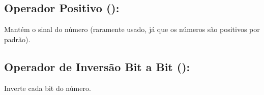 \documentclass[letterpaper,10pt,english]{jupyterBook}
\begin{document}
\begin{sphinxVerbatim}[commandchars=\\\{\}]
  
  
\end{sphinxVerbatim}

\begin{sphinxVerbatim}[commandchars=\\\{\}]
\end{sphinxVerbatim}


\subsection{Operador Positivo (\sphinxstyleliteralintitle{\sphinxupquote{+}}):}
\label{\detokenize{chapters/ch3/ch3:operador-positivo}}
\sphinxAtStartPar
Mantém o sinal do número (raramente usado, já que os números são positivos por padrão).

\begin{sphinxVerbatim}[commandchars=\\\{\}]
  
    
\end{sphinxVerbatim}

\begin{sphinxVerbatim}[commandchars=\\\{\}]
\end{sphinxVerbatim}


\subsection{Operador de Inversão Bit a Bit (\sphinxstyleliteralintitle{\sphinxupquote{\textasciitilde{}}}):}
\label{\detokenize{chapters/ch3/ch3:operador-de-inversao-bit-a-bit}}
\sphinxAtStartPar
Inverte cada bit do número.

\begin{sphinxVerbatim}[commandchars=\\\{\}]
  
  
\end{sphinxVerbatim}

\begin{sphinxVerbatim}[commandchars=\\\{\}]
\end{sphinxVerbatim}
\end{document}
